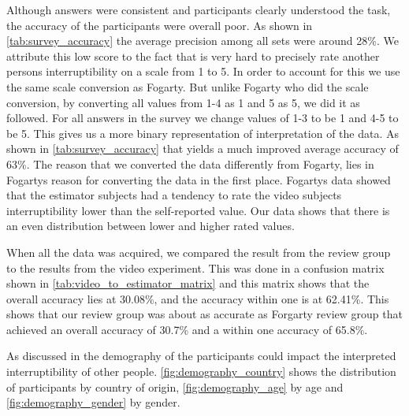 \documentclass{sigchi}
\begin{document}
Although answers were consistent and participants clearly understood the task, the accuracy of the participants were overall poor.
As shown in \autoref{tab:survey_accuracy} the average precision among all sets were around 28\%.
We attribute this low score to the fact that is very hard to precisely rate another persons interruptibility on a scale from 1 to 5.
In order to account for this we use the same scale conversion as Fogarty\cite{fogarty2005predicting}.
But unlike Fogarty who did the scale conversion, by converting all values from 1-4 as 1 and 5 as 5, we did it as followed.
For all answers in the survey we change values of 1-3 to be 1 and 4-5 to be 5.
This gives us a more binary representation of interpretation of the data.
As shown in \autoref{tab:survey_accuracy} that yields a much improved average accuracy of 63\%.
The reason that we converted the data differently from Fogarty, lies in Fogartys reason for converting the data in the first place.
Fogartys data showed that the estimator subjects had a tendency to rate the video subjects interruptibility lower than the self-reported value.
Our data shows that there is an even distribution between lower and higher rated values.

When all the data was acquired, we compared the result from the review group to the results from the video experiment.
This was done in a confusion matrix shown in \autoref{tab:video_to_estimator_matrix} and this matrix shows that the overall accuracy lies at 30.08\%, and the accuracy within one is at 62.41\%.
This shows that our review group was about as accurate as Forgarty review group \cite{fogarty2005predicting} that achieved an overall accuracy of 30.7\% and a within one accuracy of 65.8\%.

As discussed in  the demography of the participants could impact the interpreted interruptibility of other people.
\autoref{fig:demography_country} shows the distribution of participants by country of origin, \autoref{fig:demography_age} by age and \autoref{fig:demography_gender} by gender.
\end{document}

